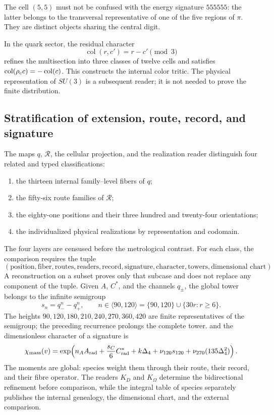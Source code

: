 The cell \((5,5)\) must not be confused with the energy signature
\(555555\): the latter belongs to the transversal representative of one of
the five regions of \(\pi\). They are distinct objects sharing the central
digit.

In the quark sector, the residual character
\[
 \operatorname{col}(r,c')=r-c'\pmod3
\]
refines the multisection into three classes of twelve cells and satisfies
\(\operatorname{col}(\rho_{\rm c} c)=-\operatorname{col}(c)\). This constructs the internal
color tritic. The physical representation of \(SU(3)\) is a
subsequent reader; it is not needed to prove the finite distribution.

\subsection{Stratification of extension, route, record, and signature}

The maps \(q\), \(\mathcal R\), the cellular projection, and the
realization reader distinguish four related and typed classifications:
\begin{enumerate}[label=(\roman*)]
 \item the thirteen internal family--level fibers of \(q\);
 \item the fifty-six route families of \(\mathcal R\);
 \item the eighty-one positions and their three hundred and twenty-four
       orientations;
 \item the individualized physical realizations by representation and codomain.
\end{enumerate}
The four layers are censused before the metrological contrast. For each class,
the comparison requires the tuple
\[
(\text{position},\text{fiber},\text{routes},\text{readers},
\text{record},\text{signature},\text{character},\text{towers},
\text{dimensional chart}).
\]
A reconstruction on a subset proves only that subcase and does not
replace any component of the tuple.
Given \(A\), \(C^*\), and the channels \(q_\pm\), the global tower belongs to the
infinite semigroup
\[
 s_n=q_-^n-q_+^n,
 \qquad
 n\in\langle90,120\rangle
 =\{90,120\}\cup\{30r:r\geq6\}.
\]
The heights \(90,120,180,210,240,270,360,420\) are finite representatives of the semigroup; the
preceding recurrence prolongs the complete tower. and the
dimensionless character of a signature is
\[
 \chi_{\rm mass}(v)=\exp\!\left(
 n_AA_{\rm rad}+\frac{s_C}{6}C^*_{\rm rad}
 +k\Delta_4+\nu_{120}s_{120}+\nu_{270}(135\Delta_4^2)
 \right).
\]
The moments are global: species weight them through their route, their
record, and their fibre operator. The readers \(K_D\) and \(K_\Omega\)
determine the bidirectional refinement before comparison, while the
integral table of species separately publishes the internal genealogy, the
dimensional chart, and the external comparison.

